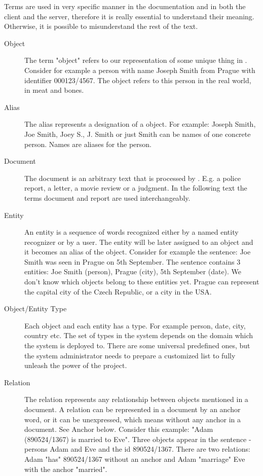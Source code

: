 Terms are used in very specific manner in the documentation and in both the
client and the server, therefore it is really essential to understand their
meaning. Otherwise, it is possible to misunderstand the rest of the text.

\begin{description}
\item[Object]
The term "object" refers to our representation of some unique thing in
\textan{}. Consider for example a person with name Joseph Smith from Prague with
identifier 000123/4567. The object refers to this person in the real world, in
meat and bones.

\item[Alias]
The alias represents a designation of a object. For example: Joseph Smith, Joe
Smith, Joey S., J. Smith or just Smith can be names of one concrete person.
Names are aliases for the person.


\item[Document]
The document is an arbitrary text that is processed by \textan{}. E.g. a police
report, a letter, a movie review or a judgment. In the following text the terms
document and report are used interchangeably.

\item[Entity]
An entity is a sequence of words recognized either by a named entity recognizer
or by a user. The entity will be later assigned to an object and it becomes an alias
of the object. Consider for example the sentence: Joe Smith was seen
in Prague on 5th September. The sentence contains 3 entities: Joe Smith (person),
Prague (city), 5th September (date). We don't know which objects belong to these
entities yet. Prague can represent the capital city of the Czech Republic,
or a city in the USA.

\item[Object/Entity Type]
Each object and each entity has a type. For example person, date, city, country
etc. The set of types in the system depends on the domain which the system is
deployed to. There are some universal predefined ones, but the system
administrator needs to prepare a customized list to fully unleash the power of
the project.

\item[Relation]
The relation represents any relationship between objects mentioned in a document.
A relation can be represented in a document by an anchor word, or it can be
unexpressed, which means without any anchor in a document. See Anchor below.
Consider this example: "Adam (890524/1367) is married to Eve". Three objects
appear in the sentence - persons Adam and Eve and the id 890524/1367. There
are two relations: Adam "has" 890524/1367 without an anchor and Adam "marriage"
Eve with the anchor "married".


\end{description}
